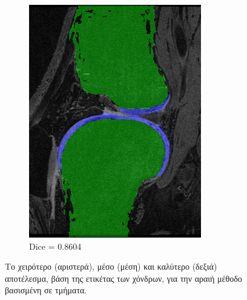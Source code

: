 \documentclass[a4paper,12pt]{article}
\begin{document}
\begin{figure}[H]
\begin{subfigure}[b]{0.32\linewidth}
    \includegraphics[width=\linewidth]{final_SPBM_best.png}
    \caption{Dice = 0.8604}
    \end{subfigure}

    \caption{Το χειρότερο (αριστερά), μέσο (μέση) και καλύτερο (δεξιά)
             αποτέλεσμα, βάση της ετικέτας των χόνδρων, για την αραιή μέθοδο
             βασισμένη σε τμήματα.}
    \label{fig:final_dice_SPBM}
\end{figure}
\end{document}
